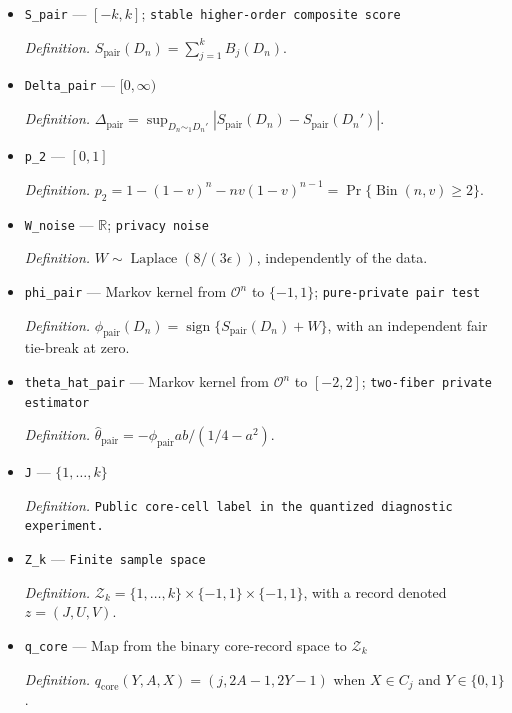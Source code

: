 \documentclass{article}
\begin{document}
\begin{itemize}
  \item \texttt{S\_\allowbreak{}pair} --- \([-k,k]\); \texttt{stable higher-\allowbreak{}order composite score}
  \par\smallskip\noindent\emph{Definition.} \(S_{\mathrm{pair}}(D_n)=\sum_{j=1}^kB_j(D_n)\).
  \item \texttt{Delta\_\allowbreak{}pair} --- \([0,\infty)\)
  \par\smallskip\noindent\emph{Definition.} \(\Delta_{\mathrm{pair}}=\sup_{D_n\sim_1D_n'}|S_{\mathrm{pair}}(D_n)-S_{\mathrm{pair}}(D_n')|\).
  \item \texttt{p\_\allowbreak{}2} --- \([0,1]\)
  \par\smallskip\noindent\emph{Definition.} \(p_2=1-(1-v)^n-nv(1-v)^{n-1}=\Pr\{\operatorname{Bin}(n,v)\ge2\}\).
  \item \texttt{W\_\allowbreak{}noise} --- \(\mathbb R\); \texttt{privacy noise}
  \par\smallskip\noindent\emph{Definition.} \(W\sim\operatorname{Laplace}(8/(3\epsilon))\), independently of the data.
  \item \texttt{phi\_\allowbreak{}pair} --- Markov kernel from \(\mathcal O^n\) to \(\{-1,1\}\); \texttt{pure-\allowbreak{}private pair test}
  \par\smallskip\noindent\emph{Definition.} \(\phi_{\mathrm{pair}}(D_n)=\operatorname{sign}\{S_{\mathrm{pair}}(D_n)+W\}\), with an independent fair tie-break at zero.
  \item \texttt{theta\_\allowbreak{}hat\_\allowbreak{}pair} --- Markov kernel from \(\mathcal O^n\) to \([-2,2]\); \texttt{two-\allowbreak{}fiber private estimator}
  \par\smallskip\noindent\emph{Definition.} \(\widehat\theta_{\mathrm{pair}}=-\phi_{\mathrm{pair}}ab/(1/4-a^2)\).
  \item \texttt{J} --- \(\{1,\ldots,k\}\)
  \par\smallskip\noindent\emph{Definition.} \texttt{Public core-\allowbreak{}cell label in the quantized diagnostic experiment.}
  \item \texttt{Z\_\allowbreak{}k} --- \texttt{Finite sample space}
  \par\smallskip\noindent\emph{Definition.} \(\mathcal Z_k=\{1,\ldots,k\}\times\{-1,1\}\times\{-1,1\}\), with a record denoted \(z=(J,U,V)\).
  \item \texttt{q\_\allowbreak{}core} --- Map from the binary core-record space to \(\mathcal Z_k\)
  \par\smallskip\noindent\emph{Definition.} \(q_{\mathrm{core}}(Y,A,X)=(j,2A-1,2Y-1)\) when \(X\in C_j\) and \(Y\in\{0,1\}\).

\end{itemize}
\end{document}
